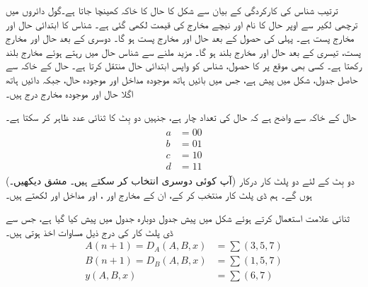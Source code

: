 \quad
ترتیب شناس کی کارکردگی کے بیان سے شکل  کا حال کا خاکہ کھینچا جاتا ہے۔گول دائروں میں ترچھی لکیر سے اوپر حال کا نام اور نیچے مخارج کی قیمت لکھی گئی ہے۔ شناس کا ابتدائی حال  اور مخارج پست  ہے۔ پہلی   کی  حصول کے بعد حال  اور مخارج پست ہو گا۔ دوسری   کے بعد حال  اور مخارج پست، تیسری  کے بعد حال  اور مخارج بلند ہو گا۔ مزید  ملنے سے شناس حال  میں رہتے ہوئے مخارج بلند رکھتا ہے۔ کسی بھی موقع پر  کا حصول، شناس کو واپس ابتدائی حال  منتقل کرتا ہے۔ حال  کے خاکہ سے حاصل جدول، شکل  میں پیش ہے، جس میں بائیں ہاتھ موجودہ مداخل اور موجودہ حال، جبکہ دائیں ہاتھ اگلا حال اور موجودہ مخارج درج ہیں۔

حال  کے خاکہ سے واضح ہے کہ حال کی تعداد چار ہے، جنہیں دو بِٹ کا ثنائی عدد ظاہر کر سکتا ہے۔
\begin{gather}
\begin{aligned}\label{مساوات_ترتیبی_شناس_حال_انتخاب}
a&=00\\
b&=01\\
c&=10\\
d&=11
\end{aligned}
\end{gather}
(آپ کوئی دوسری انتخاب کر سکتے ہیں۔ مشق  دیکھیں۔) دو بِٹ کے لئے دو پلٹ کار درکار ہوں گے۔ ہم ڈی پلٹ کار منتخب کر کے، ان کے مخارج  اور ، اور مداخل  اور  لکھتے ہیں۔

ثنائی علامت استعمال کرتے ہوئے شکل  میں پیش جدول دوبارہ جدول  میں پیش کیا گیا ہے، جس سے ڈی پلٹ کار کی درج ذیل مساوات اخذ ہوتی ہیں۔
\begin{align*}
A(n+1)=D_A(A,B,x)&=\sum(3,5,7)\\
B(n+1)=D_B(A,B,x)&=\sum(1,5,7)\\
y(A,B,x)&=\sum(6,7)
\end{align*}

